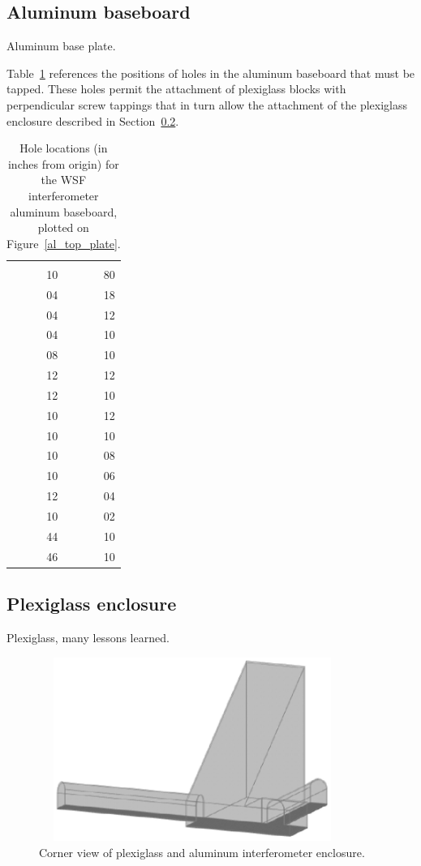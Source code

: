         \subsection{Aluminum baseboard}
        \label{baseplate}

            Aluminum base plate.

Table~\ref{aluminum_baseboard_hole_locations} references the positions of holes in the aluminum baseboard that must be tapped. These holes permit the attachment of plexiglass blocks with perpendicular screw tappings that in turn allow the attachment of the plexiglass enclosure described in Section~\ref{enclosure}.

\begin{table}[t]
\begin{tabular}{ r r }
\hline \\
10 & 80\\
04 & 18\\
04 & 12\\
04 & 10\\
08 & 10\\
12 & 12\\
12 & 10\\
10 & 12\\
10 & 10\\
10 & 08\\
10 & 06\\
12 & 04\\
10 & 02\\
44 & 10\\
46 & 10 \\
\hline
\end{tabular}
\caption{Hole locations (in inches from origin) for the WSF interferometer aluminum baseboard, plotted on Figure~\ref{al_top_plate}.}
\label{aluminum_baseboard_hole_locations}
\end{table}

        \subsection{Plexiglass enclosure}
        \label{enclosure}

            Plexiglass, many lessons learned.

        \begin{figure}
        \begin{center}
        \includegraphics[height=60mm, width=100mm]{view-corner.eps}
        \caption{Corner view of plexiglass and aluminum interferometer enclosure.}
        \label{plex-view-corner}
        \end{center}
        \end{figure}

